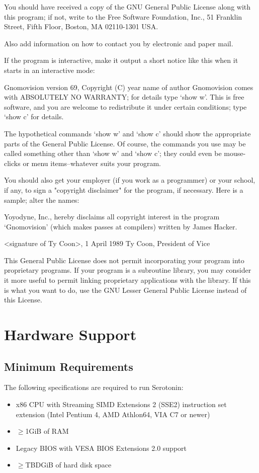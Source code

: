 \documentclass[11pt,a4paper]{article}
\begin{document}
\begin{itemize}
		You should have received a copy of the GNU General Public License along
		with this program; if not, write to the Free Software Foundation, Inc.,
		51 Franklin Street, Fifth Floor, Boston, MA 02110-1301 USA.

		Also add information on how to contact you by electronic and paper mail.

		If the program is interactive, make it output a short notice like this
		when it starts in an interactive mode:

		Gnomovision version 69, Copyright (C) year name of author
		Gnomovision comes with ABSOLUTELY NO WARRANTY; for details type `show w'.
		This is free software, and you are welcome to redistribute it
		under certain conditions; type `show c' for details.

		The hypothetical commands `show w' and `show c' should show the appropriate
		parts of the General Public License.  Of course, the commands you use may
		be called something other than `show w' and `show c'; they could even be
		mouse-clicks or menu items--whatever suits your program.

		You should also get your employer (if you work as a programmer) or your
		school, if any, to sign a "copyright disclaimer" for the program, if
		necessary.  Here is a sample; alter the names:

		Yoyodyne, Inc., hereby disclaims all copyright interest in the program
		`Gnomovision' (which makes passes at compilers) written by James Hacker.

		<signature of Ty Coon>, 1 April 1989
		Ty Coon, President of Vice

		This General Public License does not permit incorporating your program into
		proprietary programs.  If your program is a subroutine library, you may
		consider it more useful to permit linking proprietary applications with the
		library.  If this is what you want to do, use the GNU Lesser General
		Public License instead of this License.
	\end{itemize}

	\section{Hardware Support}

	\subsection{Minimum Requirements}

	The following specifications are required to run Serotonin:
	\begin{itemize}
		\item x86 CPU with Streaming SIMD Extensions 2 (SSE2) instruction set extension (Intel Pentium 4, AMD Athlon64, VIA C7 or newer)
		\item $\geq$1GiB of RAM
		\item Legacy BIOS with VESA BIOS Extensions 2.0 support
		\item $\geq$TBDGiB of hard disk space
	\end{itemize}
\end{document}
